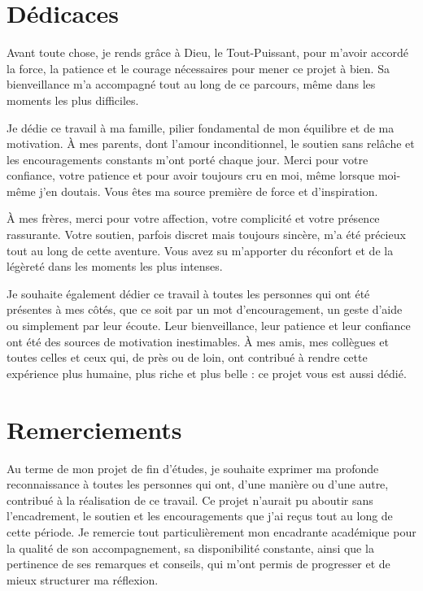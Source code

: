 \documentclass[12pt,a4paper]{report}
\begin{document}
\thispagestyle{empty}
\vspace*{5cm}
\chapter*{Dédicaces}


Avant toute chose, je rends grâce à Dieu, le Tout-Puissant, pour m’avoir accordé la force, la patience et le courage nécessaires pour mener ce projet à bien. Sa bienveillance m’a accompagné tout au long de ce parcours, même dans les moments les plus difficiles.

Je dédie ce travail à ma famille, pilier fondamental de mon équilibre et de ma motivation. À mes parents, dont l’amour inconditionnel, le soutien sans relâche et les encouragements constants m’ont porté chaque jour. Merci pour votre confiance, votre patience et pour avoir toujours cru en moi, même lorsque moi-même j’en doutais. Vous êtes ma source première de force et d’inspiration.

À mes frères, merci pour votre affection, votre complicité et votre présence rassurante. Votre soutien, parfois discret mais toujours sincère, m’a été précieux tout au long de cette aventure. Vous avez su m’apporter du réconfort et de la légèreté dans les moments les plus intenses.

Je souhaite également dédier ce travail à toutes les personnes qui ont été présentes à mes côtés, que ce soit par un mot d’encouragement, un geste d’aide ou simplement par leur écoute. Leur bienveillance, leur patience et leur confiance ont été des sources de motivation inestimables. À mes amis, mes collègues et toutes celles et ceux qui, de près ou de loin, ont contribué à rendre cette expérience plus humaine, plus riche et plus belle : ce projet vous est aussi dédié.

\chapter*{Remerciements}


Au terme de mon projet de fin d'études, je souhaite exprimer ma profonde reconnaissance à toutes les personnes qui ont, d’une manière ou d’une autre, contribué à la réalisation de ce travail. Ce projet n’aurait pu aboutir sans l’encadrement, le soutien et les encouragements que j’ai reçus tout au long de cette période. Je remercie tout particulièrement mon encadrante académique pour la qualité de son accompagnement, sa disponibilité constante, ainsi que la pertinence de ses remarques et conseils, qui m’ont permis de progresser et de mieux structurer ma réflexion.
\end{document}
